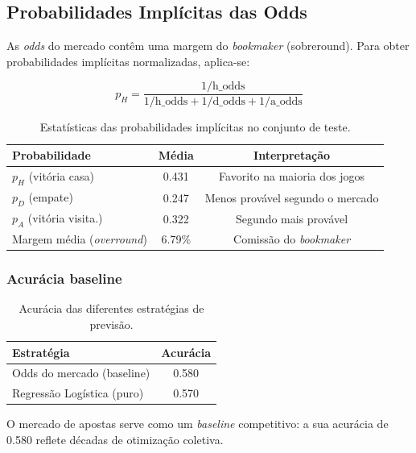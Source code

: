 \documentclass[12pt, a4paper]{article}
\begin{document}
\subsection{Probabilidades Implícitas das Odds}

As \textit{odds} do mercado contêm uma margem do \textit{bookmaker} (sobreround). Para obter probabilidades implícitas normalizadas, aplica-se:

\[
  p_H = \frac{1/\text{h\_odds}}{1/\text{h\_odds} + 1/\text{d\_odds} + 1/\text{a\_odds}}
\]

\begin{table}[H]
  \centering
  \caption{Estatísticas das probabilidades implícitas no conjunto de teste.}
  \begin{tabular}{lcc}
    \toprule
    \textbf{Probabilidade} & \textbf{Média} & \textbf{Interpretação} \\
    \midrule
    $p_H$ (vitória casa)    & 0.431 & Favorito na maioria dos jogos \\
    $p_D$ (empate)          & 0.247 & Menos provável segundo o mercado \\
    $p_A$ (vitória visita.) & 0.322 & Segundo mais provável \\
    \midrule
    Margem média (\textit{overround}) & 6.79\% & Comissão do \textit{bookmaker} \\
    \bottomrule
  \end{tabular}
  \label{tab:odds_proba}
\end{table}

\subsubsection{Acurácia baseline}

\begin{table}[H]
  \centering
  \caption{Acurácia das diferentes estratégias de previsão.}
  \begin{tabular}{lc}
    \toprule
    \textbf{Estratégia}              & \textbf{Acurácia} \\
    \midrule
    Odds do mercado (baseline)       & 0.580             \\
    Regressão Logística (puro)       & 0.570             \\
    \bottomrule
  \end{tabular}
  \label{tab:accuracy_baseline}
\end{table}

O mercado de apostas serve como um \textit{baseline} competitivo: a sua acurácia de 0.580 reflete décadas de otimização coletiva.
\end{document}
